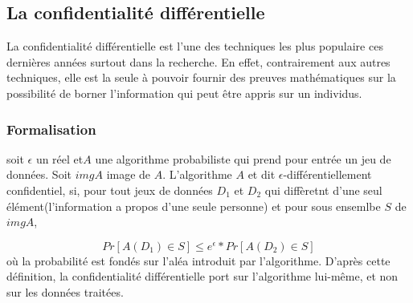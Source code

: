 \subsection{La confidentialité différentielle}
La confidentialité différentielle est l'une des techniques les plus populaire ces dernières années surtout dans la recherche. En effet, contrairement aux autres techniques, elle est la seule à pouvoir fournir des preuves mathématiques sur la possibilité de borner l'information qui peut être appris sur un individus.

\subsubsection{Formalisation}
soit \begin{math}\epsilon\end{math} un réel et\begin{math}A\end{math} une algorithme probabiliste qui prend pour entrée un jeu de données. Soit \begin{math}imgA\end{math} image de \begin{math}A\end{math}. L'algorithme \begin{math}A\end{math} et dit \begin{math}\epsilon\end{math}-différentiellement confidentiel, si, pour tout jeux de données \begin{math}D_{1}\end{math} et \begin{math}D_{2}\end{math} qui diffèretnt d'une seul élément(l'information a propos d'une seule personne) et pour sous ensemlbe \begin{math}S\end{math} de \begin{math}imgA\end{math},

\[
Pr[A(D_{1})\in S] \leq e^{\epsilon} * Pr[A(D_{2})\in S]
\]
où la probabilité est fondés sur l'aléa introduit par l'algorithme. D'après cette définition, la confidentialité différentielle port sur l'algorithme lui-même, et non sur les données traitées.
